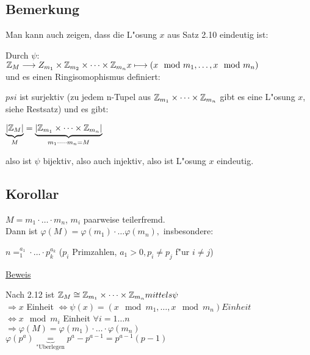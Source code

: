 \subsection{Bemerkung}
Man kann auch zeigen, dass die L"osung $x$ aus Satz 2.10 eindeutig ist:

Durch $\psi$: \\$\mathbb{Z} _M \longrightarrow Z_{m_1} \times \mathbb{Z}_{m_2} \times \dots \times \mathbb{Z}_{m_n}\\
x \longmapsto (x \mod{m_1}, \dots, x \mod{m_n})$\\
und es einen Ringisomophismus definiert:

$psi$ ist surjektiv (zu jedem n-Tupel aus $\mathbb{Z}_{m_1}\times \dots \times \mathbb{Z}_{m_n}$ gibt es eine L"osung $x$, siehe Restsatz) und es gibt:

$\underbrace{|\mathbb{Z}_M|}_{M}=\underbrace{|\mathbb{Z}_{m_1}\times \dots \times \mathbb{Z}_{m_n}|}_{m_1\cdot \dots \cdot m_n = M}$

also ist $\psi$ bijektiv, also auch injektiv, also ist L"osung $x$ eindeutig.

\subsection{Korollar}
$M=m_1\cdot \dots \cdot m_n$, $m_i$ paarweise teilerfremd.\\
Dann ist $\varphi(M)=\varphi(m_1)\cdot \dots \varphi(m_n),$ insbesondere:

$n=^{a_1}_1 \cdot \dots \cdot p^{a_k}_k$ ($p_i$ Primzahlen, $a_1>0, p_i \neq p_j$ f"ur $i\neq j$)

\underline{Beweis}

Nach 2.12 ist $\mathbb{Z}_M \cong \mathbb{Z}_{m_1} \times \dots \times \mathbb{Z}_{m_n} mittels \psi$\\
$\Rightarrow x$ Einheit $\Leftrightarrow \psi(x) = ( x\mod{m_1}, \dots, x \mod{m_n}) Einheit$
\\ $\Leftrightarrow x \mod{m_i}$ Einheit $\forall i = 1 \dots n$\\
$\Rightarrow \varphi(M) = \varphi(m_1) \cdot \dots \cdot \varphi(m_n)$\\
$\varphi(p^a)\underbrace{=}_{\text{"Uberlegen}}p^a - p^{a-1} = p^{a-1}(p-1)$

